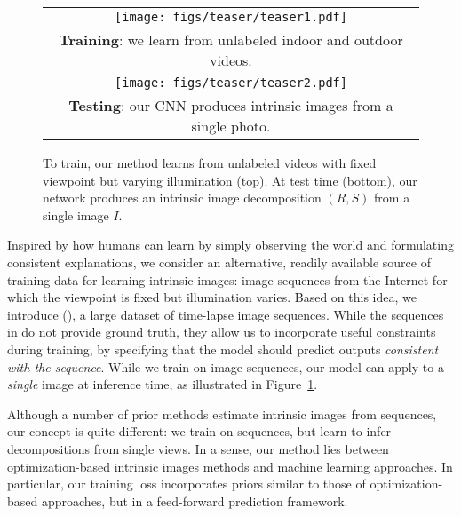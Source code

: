 \documentclass[10pt,twocolumn,letterpaper]{article}
\begin{document}
\begin{figure}[t]
  \centering
	\begin{tabular}{@{\hspace{0.1em}}c@{\hspace{0.1em}}}
        \texttt{[image: figs/teaser/teaser1.pdf]}  \vspace{-0.1em} \\ 
        {\small {\bf Training}: we learn from unlabeled indoor and outdoor videos.}  \\ 
        \texttt{[image: figs/teaser/teaser2.pdf]} \vspace{-0.1em} \\
        {\small {\bf Testing}: our CNN produces intrinsic images from a single photo.} \vspace{-0.5em}
    \end{tabular} 
	   \caption{
             \label{fig:teaser} To train, our method learns from unlabeled
            videos with fixed viewpoint but varying illumination
            (top).  At test time (bottom), our network produces an
            intrinsic image decomposition $(R, S)$ from a single image
            $I$.} \vspace{-0.5em}
\end{figure}Inspired by how humans can learn by simply observing the world and
formulating consistent explanations, we consider an alternative,
readily available source of training data for learning intrinsic
images: image sequences from the Internet for which the viewpoint is
fixed but illumination varies. Based on this idea, we introduce \BT
(\BTShort), a large dataset of time-lapse image sequences.
While the sequences in \BTShort do not provide ground truth, they
allow us to incorporate useful constraints during training, by
specifying that the model should predict outputs {\em consistent with
  the sequence}.
While we train on image sequences, our model can apply to a {\em
  single} image at inference time, as illustrated in
Figure~\ref{fig:teaser}.

Although a number of prior methods estimate intrinsic images from
sequences, our concept is quite different: we train on sequences, but learn to
infer decompositions from single views. In a sense, our method lies
between optimization-based intrinsic images methods and machine
learning approaches.  In particular, our training loss incorporates
priors similar to those of optimization-based approaches, but in a
feed-forward prediction framework.
\end{document}
